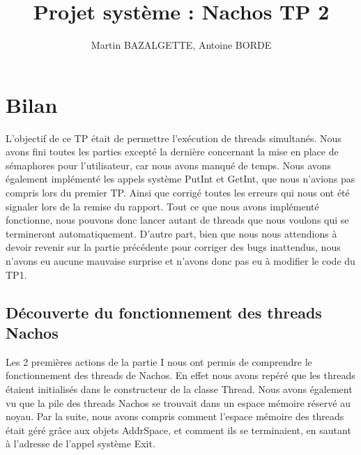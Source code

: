\documentclass[10pt]{article}
\begin{document}
\title{Projet système : Nachos TP 2}
\author{Martin BAZALGETTE, Antoine BORDE}
\maketitle

\newpage
\tableofcontents
\newpage

\section{Bilan}
L'objectif de ce TP était de permettre l'exécution de threads simultanés.
Nous avons fini toutes les parties excepté la dernière concernant la mise en place de sémaphores pour l'utilisateur, car nous avons manqué de temps.
Nous avons également implémenté les appels système \textcolor{blue2}{PutInt} et \textcolor{blue2}{GetInt},
que nous n'avions pas compris lors du premier TP. Ainsi que corrigé toutes les erreurs qui
nous ont été signaler lors de la remise du rapport.
\newline
Tout ce que nous avons implémenté fonctionne, nous pouvons donc lancer autant de threads que nous voulons qui se termineront automatiquement.
D'autre part, bien que nous nous attendions à devoir revenir sur la partie précédente pour corriger des bugs inattendus, nous n'avons eu aucune mauvaise surprise et n'avons donc pas eu à modifier le code du TP1.

\subsection{Découverte du fonctionnement des threads Nachos}
Les 2 premières actions de la partie I nous ont permis de comprendre le fonctionnement des threads de Nachos. En effet nous avons repéré que les threads étaient initialisés dans le constructeur de la classe Thread. Nous avons également vu que la pile des threads Nachos se trouvait dans un espace mémoire réservé au noyau.
Par la suite, nous avons compris comment l'espace mémoire des threads était géré grâce aux objets AddrSpace, et comment ils se terminaient, en sautant à l'adresse de l'appel système \textcolor{blue2}{Exit}.
\end{document}
